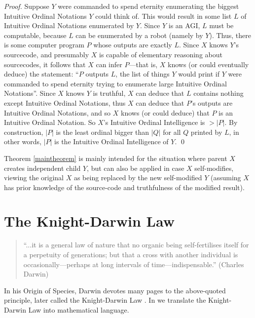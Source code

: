 \documentclass[runningheads]{llncs}
\begin{document}
\begin{proof}
    Suppose $Y$ were commanded to
    spend eternity enumerating the biggest Intuitive Ordinal Notations $Y$ could
    think of. This would result in some list $L$ of Intuitive Ordinal Notations
    enumerated by $Y$. Since $Y$ is an AGI, $L$ must be computable, because $L$ can
    be enumerated by a robot (namely by $Y$). Thus, there is some computer program
    $P$ whose outputs are exactly $L$. Since $X$ knows $Y$'s sourcecode,
    and presumably $X$ is capable of elementary reasoning about sourcecodes,
    it follows that $X$ can infer $P$---that is,
    $X$ knows (or could eventually deduce) the statement: ``$P$ outputs
    $L$, the list of things $Y$ would print if $Y$ were commanded to spend eternity
    trying to enumerate large Intuitive Ordinal Notations''.
    Since $X$ knows $Y$ is truthful,
    $X$ can deduce that $L$ contains nothing except Intuitive Ordinal Notations,
    thus $X$ can deduce that $P$'s outputs are Intuitive Ordinal Notations,
    and so $X$ knows (or could deduce) that $P$ is an Intuitive Ordinal Notation.
    So $X$'s Intuitive Ordinal Intelligence is $>|P|$. By construction, $|P|$ is
    the least ordinal bigger than $|Q|$ for all $Q$ printed by $L$, in other words,
    $|P|$ is the Intuitive Ordinal Intelligence of $Y$.
    \qed
\end{proof}

Theorem \ref{maintheorem} is mainly intended for the situation where parent $X$ creates
independent child $Y$, but can also be applied in case $X$ self-modifies,
viewing the original $X$ as being replaced by the new self-modified
$Y$ (assuming $X$ has prior
knowledge of the source-code and truthfulness of the modified result).

\section{The Knight-Darwin Law}
\label{knightdarwinagisection}

\begin{quote}
``...it is a general law of nature that no organic being self-fertilises itself
for a perpetuity of generations; but that a cross with another individual
is occasionally---perhaps at long intervals of time---indispensable.''
(Charles Darwin)
\end{quote}

In his Origin of Species, Darwin devotes many
pages to the above-quoted principle, later called the
Knight-Darwin Law \cite{darwin1898knight}. In \cite{alexander2013}
we translate
the Knight-Darwin Law into mathematical language.
\end{document}
